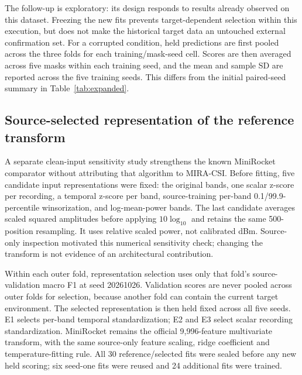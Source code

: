 The follow-up is exploratory: its design responds to results already observed on this dataset. Freezing the new fits prevents target-dependent selection within this execution, but does not make the historical target data an untouched external confirmation set. For a corrupted condition, held predictions are first pooled across the three folds for each training/mask-seed cell. Scores are then averaged across five masks within each training seed, and the mean and sample SD are reported across the five training seeds. This differs from the initial paired-seed summary in Table~\ref{tab:expanded}.



\subsection{Source-selected representation of the reference transform}
A separate clean-input sensitivity study strengthens the known MiniRocket comparator without attributing that algorithm to MIRA-CSI. Before fitting, five candidate input representations were fixed: the original bands, one scalar z-score per recording, a temporal z-score per band, source-training per-band 0.1/99.9-percentile winsorization, and log-mean-power bands. The last candidate averages scaled squared amplitudes before applying $10\log_{10}$ and retains the same 500-position resampling. It uses relative scaled power, not calibrated dBm. Source-only inspection motivated this numerical sensitivity check; changing the transform is not evidence of an architectural contribution.

Within each outer fold, representation selection uses only that fold's source-validation macro F1 at seed 20261026. Validation scores are never pooled across outer folds for selection, because another fold can contain the current target environment. The selected representation is then held fixed across all five seeds. E1 selects per-band temporal standardization; E2 and E3 select scalar recording standardization. MiniRocket remains the official 9,996-feature multivariate transform, with the same source-only feature scaling, ridge coefficient and temperature-fitting rule. All 30 reference/selected fits were sealed before any new held scoring; six seed-one fits were reused and 24 additional fits were trained.

